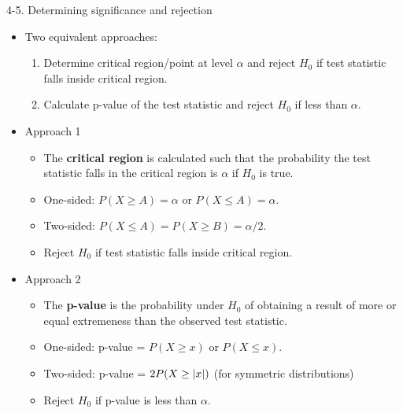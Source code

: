 \documentclass[10pt, handout, xcolor=table]{beamer}
\DeclarePairedDelimiter\abs{\lvert}{\rvert}%
\begin{document}
\begin{frame}{4-5. Determining significance and rejection}

\begin{itemize}
\item Two equivalent approaches:
\begin{enumerate}
\item Determine critical region/point at level $\alpha$ and reject $H_0$ if test statistic falls inside critical region.
\item Calculate p-value of the test statistic and reject $H_0$ if less than $\alpha$.
\end{enumerate}
\item Approach 1
\begin{itemize}
\item The \textbf{critical region} is calculated such that the probability the test statistic falls in the critical region is $\alpha$ if $H_0$ is true.
\item One-sided: $P(X \geq A) = \alpha$ or $P(X \leq A) = \alpha$.
\item[] Two-sided: $P(X \leq A) = P(X \geq B) = \alpha/2$.
\item Reject $H_0$ if test statistic falls inside critical region.
\end{itemize}
\item Approach 2
\begin{itemize}
\item The \textbf{p-value} is the probability under $H_0$ of obtaining a result of more or equal extremeness than the observed test statistic.
\item One-sided: p-value = $P(X \geq x)$ or $P(X \leq x)$.
\item[] Two-sided: p-value = $2P(X \geq \abs{x})$ (for symmetric distributions)
\item Reject $H_0$ if p-value is less than $\alpha$.
\end{itemize}
\end{itemize}

\end{frame}
\end{document}

